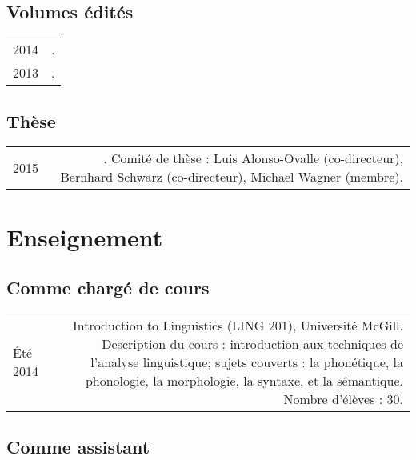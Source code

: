 \documentclass[11pt,a4paper,twoside,french]{article}
\makeatletter
\newcommand{\bodywidth}{0.77}
\newenvironment{cvsection}{%
  \setlength{\extrarowheight}{0.70ex}
  \begin{longtable}[l]{@{} L R @{}}
}{%
  \end{longtable}
}
\newcommand{\course}[3]{%
  \parbox[t]{\bodywidth\textwidth}{#1.\\ {\footnotesize Description du cours : #2.
      Nombre d'élèves : #3.}}
}
\makeatother
\begin{document}
\subsection*{Volumes édités}

\begin{cvsection}
  2014 & .\\
  2013 & .\\
\end{cvsection}

\subsection*{Thèse}

\begin{cvsection}
  2015 & . Comité de thèse : Luis Alonso-Ovalle (co-directeur), Bernhard Schwarz (co-directeur), Michael Wagner (membre).\\
\end{cvsection}

\section*{Enseignement}

\subsection*{Comme chargé de cours}

\begin{cvsection}
  Été 2014 & \course{Introduction to Linguistics (LING 201), Université McGill}
  {introduction aux techniques de l'analyse linguistique; sujets couverts : la phonétique, la phonologie, la morphologie, la syntaxe, et la sémantique}
  {30}
\end{cvsection}

\subsection*{Comme assistant}
\end{document}
